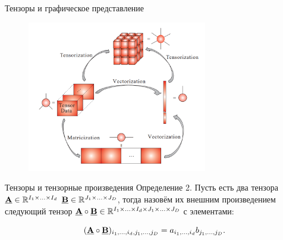 \begin{frame}{Тензоры и графическое представление}
\begin{figure}
    \centering
    \includegraphics[width=0.7\textwidth]{lecture_10/figs/tensor_vector_matrix.png}
\end{figure}
\end{frame}
\begin{frame}{Тензоры и тензорные произведения}
Определение 2. Пусть есть два тензора $\underline{\textbf{A}} \in \mathbb{R}^{I_1 \times ... \times I_d}$ $\underline{\textbf{B}} \in \mathbb{R}^{J_1 \times ... \times J_D}$,  тогда назовём  их внешним произведением следующий тензор $\underline{\textbf{A}} \circ \underline{\textbf{B}} \in \mathbb{R}^{I_1 \times ... \times I_d \times J_1 \times ... \times J_D}$ с элементами:

$$(\underline{\textbf{A}} \circ \underline{\textbf{B}})_{i_1,...,i_d,j_1,...,j_D} = a_{i_1,...,i_d}b_{j_1,...,j_D}.$$

\end{frame}

